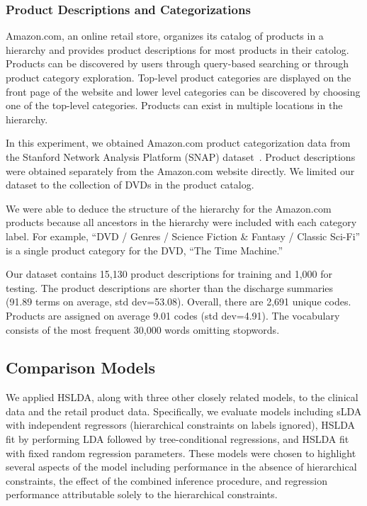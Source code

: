 \subsubsection{Product Descriptions and Categorizations}

Amazon.com, an online retail store, organizes its catalog of 
products in a hierarchy and provides product descriptions
for most products in their catolog.  Products can be discovered by users
through query-based searching or through product category exploration. Top-level
product categories are displayed on the front page of the website and lower
level categories can be discovered by choosing one of the top-level categories.
Products can exist in multiple locations in the hierarchy.

In this experiment, we obtained Amazon.com product categorization data from 
the Stanford Network Analysis Platform (SNAP) dataset~\citep{SNAP}. 
Product descriptions were obtained separately from the
Amazon.com website directly. We limited our dataset to the collection of DVDs
in the product catalog.

We were able to deduce the structure of the
hierarchy for the Amazon.com products because all ancestors in the
hierarchy were included with each category label. For example, {}``DVD / Genres
/ Science Fiction \& Fantasy / Classic Sci-Fi'' is a single product category 
for the DVD, {}``The Time Machine.''

Our dataset contains 15,130 product descriptions for training and 1,000
for testing. The product descriptions are shorter than the discharge summaries
(91.89 terms on average, std dev=53.08). Overall, there are 2,691 unique codes.
Products are assigned on average 9.01 codes (std dev=4.91). The vocabulary
consists of the most frequent 30,000 words omitting stopwords. 

\subsection{Comparison Models}

We applied HSLDA, along with three other closely related models, to
the clinical data and the retail product data. Specifically, we evaluate
models including sLDA with independent regressors (hierarchical constraints
on labels ignored), HSLDA fit by performing LDA followed by tree-conditional
regressions, and HSLDA fit with fixed random regression parameters. These
models were chosen to highlight several aspects of the model including performance in the absence 
of hierarchical constraints, the effect of the combined inference procedure, and regression
performance attributable solely to the hierarchical constraints.

